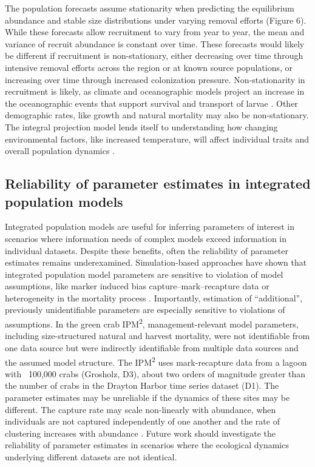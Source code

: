 \documentclass{article}
\begin{document}
The population forecasts assume stationarity when predicting the equilibrium abundance and stable size distributions under varying removal efforts (Figure 6). While these forecasts allow recruitment to vary from year to year, the mean and variance of recruit abundance is constant over time. These forecasts would likely be different if recruitment is non-stationary, either decreasing over time through intensive removal efforts across the region or at known source populations, or increasing over time through increased colonization pressure. Non-stationarity in recruitment is likely, as climate and oceanographic models project an increase in the oceanographic events that support survival and transport of larvae \parencite{du2024dispersal, cai2021changing}. Other demographic rates, like growth and natural mortality may also be non-stationary. The integral projection model lends itself to understanding how changing environmental factors, like increased temperature, will affect individual traits and overall population dynamics \parencite{plard2019ipm, dahlgren2011incorporating}. 

\subsection{Reliability of parameter estimates in integrated population models}

Integrated population models are useful for inferring parameters of interest in scenarios where information needs of complex models exceed information in individual datasets. Despite these benefits, often the reliability of parameter estimates remains underexamined. Simulation-based approaches have shown that integrated population model parameters are sensitive to violation of model assumptions, like marker induced bias capture–mark–recapture data or heterogeneity in the mortality process \parencite{riecke2019integrated}. Importantly, estimation of “additional”, previously unidentifiable parameters are especially sensitive to violations of assumptions. In the green crab IPM\textsuperscript{2}, management-relevant model parameters, including size-structured natural and harvest mortality, were not identifiable from one data source but were indirectly identifiable from multiple data sources and the assumed model structure. The IPM\textsuperscript{2} uses mark-recapture data from a lagoon with ~100,000 crabs (Grosholz, D3), about two orders of magnitude greater than the number of crabs in the Drayton Harbor time series dataset (D1). The parameter estimates may be unreliable if the dynamics of these sites may be different. The capture rate may scale non-linearly with abundance, when individuals are not captured independently of one another and the rate of clustering increases with abundance \parencite{mccarthy2013influence}. Future work should investigate the reliability of parameter estimates in scenarios where the ecological dynamics underlying different datasets are not identical. 
\end{document}
